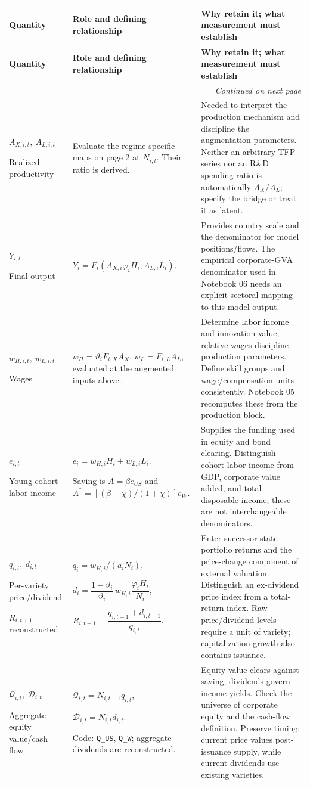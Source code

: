 \documentclass[10pt,a4paper,landscape]{article}
\makeatletter
\newcommand{\Q}{\mathcal Q}
\newcommand{\D}{\mathcal D}
\newcommand{\code}[1]{{\footnotesize\texttt{#1}}}
\newenvironment{coretable}{%
\begin{longtable}{@{}P{\dimexpr .19\textwidth-3.8pt\relax}P{\dimexpr .35\textwidth-7pt\relax}P{\dimexpr .46\textwidth-9.2pt\relax}@{}}
\toprule
\rowcolor{tablehead}\textbf{Quantity} & \textbf{Role and defining relationship} & \textbf{Why retain it; what measurement must establish}\\
\midrule
\endfirsthead
\toprule
\rowcolor{tablehead}\textbf{Quantity} & \textbf{Role and defining relationship} & \textbf{Why retain it; what measurement must establish}\\
\midrule
\endhead
\midrule\multicolumn{3}{r}{\footnotesize\itshape Continued on next page}\\
\endfoot
\bottomrule
\endlastfoot
}{\end{longtable}}
\makeatother
\begin{document}
\begin{coretable}
$A_{X,i,t},\ A_{L,i,t}$\par Realized productivity & Evaluate the regime-specific maps on page 2 at $N_{i,t}$. Their ratio is derived. & Needed to interpret the production mechanism and discipline the augmentation parameters. Neither an arbitrary TFP series nor an R\&D spending ratio is automatically $A_X/A_L$; specify the bridge or treat it as latent.\\[5pt]
$Y_{i,t}$\par Final output & $Y_i=F_i(A_{X,i}\varphi_iH_i,A_{L,i}L_i)$. & Provides country scale and the denominator for model positions/flows. The empirical corporate-GVA denominator used in Notebook 06 needs an explicit sectoral mapping to this model output.\\[5pt]
$w_{H,i,t},\ w_{L,i,t}$\par Wages & $w_H=\vartheta_iF_{i,X}A_X$, $w_L=F_{i,L}A_L$, evaluated at the augmented inputs above. & Determine labor income and innovation value; relative wages discipline production parameters. Define skill groups and wage/compensation units consistently. Notebook 05 recomputes these from the production block.\\[5pt]
$e_{i,t}$\par Young-cohort labor income & $e_i=w_{H,i}H_i+w_{L,i}L_i$.\par Saving is $A=\beta e_{US}$ and $A^*=[(\beta+\chi)/(1+\chi)]e_W$. & Supplies the funding used in equity and bond clearing. Distinguish cohort labor income from GDP, corporate value added, and total disposable income; these are not interchangeable denominators.\\[5pt]
$q_{i,t},\ d_{i,t}$\par Per-variety price/dividend\par$R_{i,t+1}$ reconstructed & $q_i=w_{H,i}/(a_iN_i)$,\par\vspace{2pt}
$d_i=\dfrac{1-\vartheta_i}{\vartheta_i}\,w_{H,i}\dfrac{\varphi_iH_i}{N_i}$,\par\vspace{3pt}
$R_{i,t+1}=\dfrac{q_{i,t+1}+d_{i,t+1}}{q_{i,t}}$. & Enter successor-state portfolio returns and the price-change component of external valuation. Distinguish an ex-dividend price index from a total-return index. Raw price/dividend levels require a unit of variety; capitalization growth also contains issuance.\\[5pt]
$\Q_{i,t},\ \D_{i,t}$\par Aggregate equity value/cash flow & $\boxed{\Q_{i,t}=N_{i,t+1}q_{i,t}}$,\par\vspace{3pt}
$\D_{i,t}=N_{i,t}d_{i,t}$.\par Code: \code{Q\_US}, \code{Q\_W}; aggregate dividends are reconstructed. & Equity value clears against saving; dividends govern income yields. Check the universe of corporate equity and the cash-flow definition. Preserve timing: current price values post-issuance supply, while current dividends use existing varieties.\\[5pt]
\end{coretable}
\end{document}
